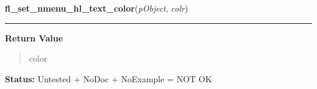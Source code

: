     \label{xformslib:library:fl_set_nmenu_hl_text_color}

    \vspace{0.5ex}

\hspace{.8\funcindent}\begin{boxedminipage}{\funcwidth}

    \raggedright \textbf{fl\_set\_nmenu\_hl\_text\_color}(\textit{pObject}, \textit{colr})

    \vspace{-1.5ex}

    \rule{\textwidth}{0.5\fboxrule}
\setlength{\parskip}{2ex}
\setlength{\parskip}{1ex}
      \textbf{Return Value}
    \vspace{-1ex}

      \begin{quote}
      color

      \end{quote}

\textbf{Status:} Untested + NoDoc + NoExample = NOT OK



    \end{boxedminipage}

    \label{xformslib:library:fl_create_positioner}

    \vspace{0.5ex}

